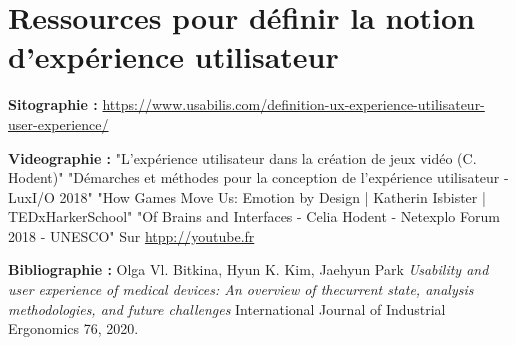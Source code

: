 \documentclass[11pt]{article}
\begin{document}
\newpage
\section{Ressources pour définir la notion d'expérience utilisateur}\label{ann:ux}
	\textbf{Sitographie :}\newline
	\href{https://www.usabilis.com/definition-ux-experience-utilisateur-user-experience/}{https://www.usabilis.com/definition-ux-experience-utilisateur-user-experience/}\par
	\textbf{Videographie :}\newline
	"L'expérience utilisateur dans la création de jeux vidéo (C. Hodent)"\newline
	"Démarches et méthodes pour la conception de l'expérience utilisateur - LuxI/O 2018"\newline
	"How Games Move Us: Emotion by Design | Katherin Isbister | TEDxHarkerSchool"\newline
	"Of Brains and Interfaces - Celia Hodent - Netexplo  Forum 2018 - UNESCO"
	Sur \href{http://youtube.fr}{htpp://youtube.fr}\par
	\textbf{Bibliographie :}\newline
	Olga Vl. Bitkina, Hyun K. Kim, Jaehyun Park \textit{Usability and user experience of medical devices: An overview of thecurrent state, analysis methodologies, and future challenges} International Journal of Industrial Ergonomics 76, 2020.

%	

\newpage
\end{document}
